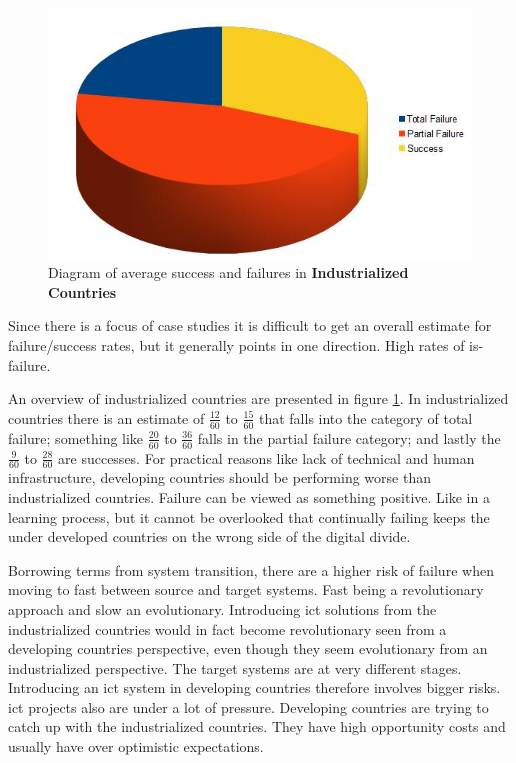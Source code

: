 \begin{figure}
\centering
\includegraphics[width=\textwidth]{literature/img/failChart}
\caption{Diagram of average success and failures in \textbf{Industrialized Countries}}
\label{fig:failchart}
\end{figure}

Since there is a focus of case studies it is difficult to get an overall estimate for failure/success rates, but it generally points in one direction. High rates of \gls{is}-failure.


An overview of industrialized countries are presented in figure \ref{fig:failchart}.
In industrialized countries there is an estimate of $\frac{12}{60}$ to $\frac{15}{60}$ that falls into the category of total failure; something like $\frac{20}{60}$ to $\frac{36}{60}$ falls in the partial failure category; and lastly the $\frac{9}{60}$ to $\frac{28}{60}$ are successes.
For practical reasons like lack of technical and human infrastructure, developing countries should be performing worse than industrialized countries.
Failure can be viewed as something positive. 
Like in a learning process, but it cannot be overlooked that continually failing keeps the under developed countries on the wrong side of the digital divide. 

Borrowing terms from system transition, there are a higher risk of failure when moving to fast between source and target systems.
Fast being a revolutionary approach and slow an evolutionary.
Introducing \gls{ict} solutions from the industrialized countries would in fact become revolutionary seen from a developing countries perspective, even though they seem evolutionary from an industrialized perspective. 
The target systems are at very different stages.
Introducing an \gls{ict} system in developing countries therefore involves bigger risks.
\gls{ict} projects also are under a lot of pressure. Developing countries are trying to catch up with the industrialized countries. They have high opportunity costs and usually have over optimistic expectations.

